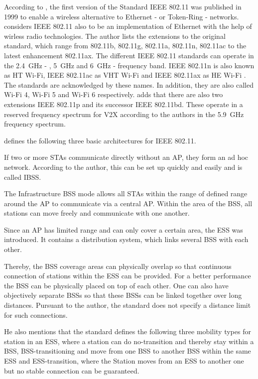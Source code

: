 \documentclass[]{nsm-thesis}
\begin{document}
According to \textcite{kauffels_wireless_2002}, the first version of the Standard IEEE 802.11 was published in 1999 to enable a wireless alternative to Ethernet - or Token-Ring - networks.
\textcite{sauter_wireless_2022} considers IEEE 802.11 also to be an implementation of Ethernet with the help of wirless radio technologies.
The author lists the extensions to the original standard, which range from 802.11b, 802.11g, 802.11a, 802.11n, 802.11ac to the latest enhancement 802.11ax. The different IEEE 802.11 standards can operate in the  \SI{2.4}{\giga\hertz} - , \SI{5}{\giga\hertz} and \SI{6}{\giga\hertz} - frequency band.
IEEE 802.11n is also known as \ac{HT} Wi-Fi, IEEE 802.11ac as \ac{VHT} Wi-Fi \cite{noauthor_ieee_2021-1} and IEEE 802.11ax as \ac{HE} Wi-Fi \cite{noauthor_ieee_2021}.
The standards are acknowledged by these names.
In addition, they are also called Wi-Fi 4, Wi-Fi 5 and Wi-Fi 6 respectively.
\textcite{jacob_system-level_2020} adds that there are also two extensions IEEE 802.11p and its successor IEEE 802.11bd. These operate in a reserved frequency spectrum for \ac{V2X} according to the authors in the \SI{5.9}{\giga\hertz} frequency spectrum.

\textcite{kauffels_wireless_2002} defines the following three basic architectures for IEEE 802.11.

If two or more \acp{STA} communicate directly without an \ac{AP}, they form an ad hoc network.
According to the author, this can be set up quickly and easily and is called \ac{IBSS}.

The Infrastructure \ac{BSS} mode allows all \ac{STA}s within the range of defined range around the \ac{AP} to communicate via a central \ac{AP}. Within the area of the \ac{BSS}, all stations can move freely and communicate with one another.

Since an \ac{AP} has limited range and can only cover a certain area, the \ac{ESS} was introduced.
It contains a distribution system, which links several \ac{BSS} with each other.

Thereby, the BSS coverage areas can physically overlap so that continuous connection of stations within the ESS can be provided.
For a better performance the \ac{BSS} can be physically placed on top of each other.
One can also have objectively separate \ac{BSS}s so that these \ac{BSS}s can be linked together over long distances.
Pursuant to the author, the standard does not specify a distance limit for such connections.

He also mentions that the standard defines the following three mobility types for station in an \ac{ESS}, where a station can do no-transition and thereby stay within a \ac{BSS}, \ac{BSS}-transitioning and move from one \ac{BSS} to another \ac{BSS} within the same \ac{ESS} and \ac{ESS}-transition, where the Station moves from an \ac{ESS} to another one but no stable connection can be guaranteed.
\end{document}

